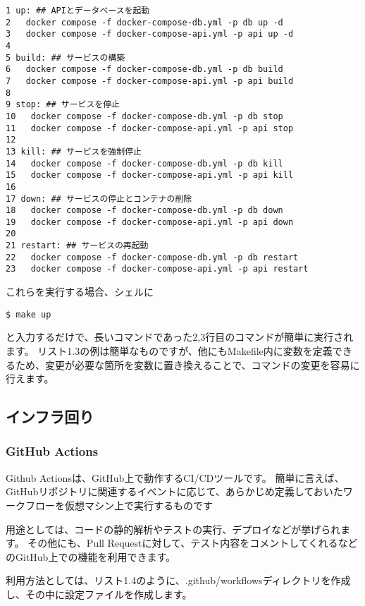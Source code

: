 \begin{tcolorbox}[title=リスト1.3 Makefile]
  \begin{verbatim}
1 up: ## APIとデータベースを起動
2   docker compose -f docker-compose-db.yml -p db up -d
3   docker compose -f docker-compose-api.yml -p api up -d
4 
5 build: ## サービスの構築
6   docker compose -f docker-compose-db.yml -p db build
7   docker compose -f docker-compose-api.yml -p api build
8 
9 stop: ## サービスを停止
10   docker compose -f docker-compose-db.yml -p db stop
11   docker compose -f docker-compose-api.yml -p api stop
12 
13 kill: ## サービスを強制停止
14   docker compose -f docker-compose-db.yml -p db kill
15   docker compose -f docker-compose-api.yml -p api kill
16 
17 down: ## サービスの停止とコンテナの削除
18   docker compose -f docker-compose-db.yml -p db down
19   docker compose -f docker-compose-api.yml -p api down
20 
21 restart: ## サービスの再起動
22   docker compose -f docker-compose-db.yml -p db restart
23   docker compose -f docker-compose-api.yml -p api restart
 \end{verbatim}
\end{tcolorbox}

これらを実行する場合、シェルに
\begin{shaded}
  \begin{verbatim}
$ make up
\end{verbatim}
\end{shaded}
と入力するだけで、長いコマンドであった2,3行目のコマンドが簡単に実行されます。
リスト1.3の例は簡単なものですが、他にもMakefile内に変数を定義できるため、変更が必要な箇所を変数に置き換えることで、コマンドの変更を容易に行えます。

\subsection{インフラ回り}

\subsubsection{GitHub Actions}
Github Actionsは、GitHub上で動作するCI/CDツールです。
簡単に言えば、GitHubリポジトリに関連するイベントに応じて、あらかじめ定義しておいたワークフローを仮想マシン上で実行するものです

用途としては、コードの静的解析やテストの実行、デプロイなどが挙げられます。
その他にも、Pull Requestに対して、テスト内容をコメントしてくれるなどのGitHub上での機能を利用できます。

利用方法としては、リスト1.4のように、.github/workflowsディレクトリを作成し、その中に設定ファイルを作成します。

